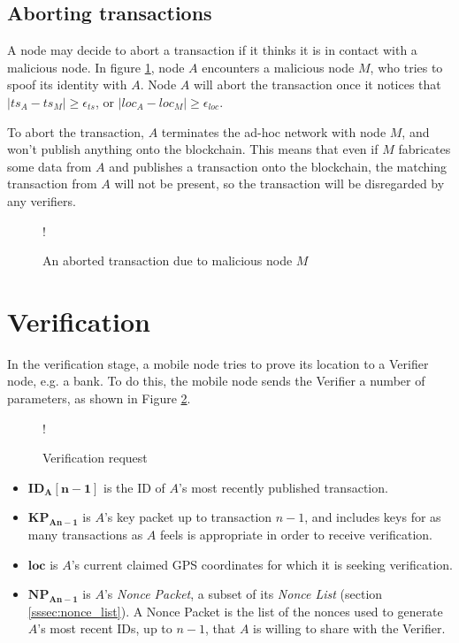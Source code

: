 \subsection{Aborting transactions}
A node may decide to abort a transaction if it thinks it is in contact with a malicious node. In figure \ref{fig:aborted_transaction}, node $A$ encounters a malicious node $M$, who tries to spoof its identity with $A$. Node $A$ will abort the transaction once it notices that $|ts_A-ts_M| \geq \epsilon_{ts}$, or $|loc_A-loc_M| \geq \epsilon_{loc}$.

To abort the transaction, $A$ terminates the ad-hoc network with node $M$, and won't publish anything onto the blockchain. This means that even if $M$ fabricates some data from $A$ and publishes a transaction onto the blockchain, the matching transaction from $A$ will not be present, so the transaction will be disregarded by any verifiers.

\begin{figure}
\resizebox {\columnwidth} {!} {}
\caption{An aborted transaction due to malicious node $M$}
\label{fig:aborted_transaction}
\end{figure}

\clearpage
\section{Verification} \label{ssec:verification}
In the verification stage, a mobile node tries to prove its location to a Verifier node, e.g. a bank. To do this, the mobile node sends the Verifier a number of parameters, as shown in Figure \ref{fig:verify_request}.

\begin{figure}[H]
\begin{center}
 {!} {}
\caption{Verification request}
\label{fig:verify_request}
\end{center}
\end{figure}

\begin{itemize}[noitemsep,topsep=0pt]
	\item[] $\mathbf{ID_{A}[n-1]}$ is the ID of $A$'s most recently published transaction.
	\item[] $\mathbf{KP_{An-1}}$ is $A$'s key packet up to transaction $n-1$, and includes keys for as many transactions as $A$ feels is appropriate in order to receive verification.
	\item[] $\mathbf{loc}$ is $A$'s current claimed GPS coordinates for which it is seeking verification.
	\item[] $\mathbf{NP_{An-1}}$ is $A$'s \textit{Nonce Packet}, a subset of its \textit{Nonce List} (section \ref{sssec:nonce_list}). A Nonce Packet is the list of the nonces used to generate $A$'s most recent IDs, up to $n-1$, that $A$ is willing to share with the Verifier. 
\end{itemize}

